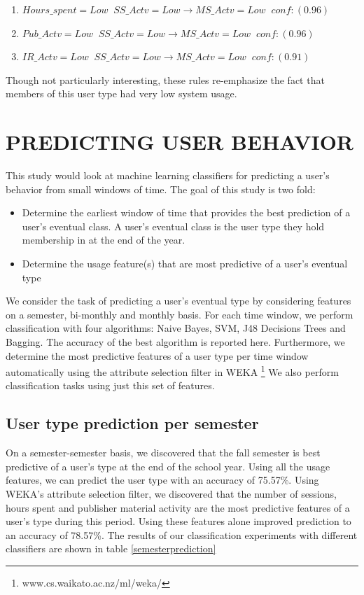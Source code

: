\documentclass{acm_proc_article-sp}
\begin{document}
\begin{enumerate}

\item $Hours\_spent=Low \;\; SS\_Actv=Low  \longrightarrow MS\_Actv =Low  \;\;    conf:(0.96)$
\item $Pub\_Actv=Low \;\; SS\_Actv=Low  \longrightarrow MS\_Actv = Low  \;\;  conf:(0.96)$
\item $IR\_Actv=Low  \;\;SS\_Actv=Low  \longrightarrow MS\_Actv=Low  \;\; conf:(0.91)$
\end{enumerate}
Though not particularly interesting, these rules re-emphasize the fact that members of this user type had very low system usage.

 \section {PREDICTING USER BEHAVIOR}
This study would look at machine learning classifiers for predicting a user's behavior from small windows of time. The goal of this study is two fold:
\begin{itemize}
\item Determine the earliest window of time that provides the best prediction of a user's eventual class. A user's eventual class is the user type they hold membership in at the end of the year.
\item Determine the usage feature(s) that are most predictive of a user's eventual type
\end{itemize}

We consider the task of predicting a user's eventual type by considering features on a semester, bi-monthly and monthly basis.
For each time window, we perform  classification with four algorithms: Naive Bayes, SVM, J48 Decisions Trees and Bagging. The accuracy of the best algorithm is reported here. Furthermore, we determine the most predictive features of a user type per time window automatically using the attribute selection filter in WEKA \footnote{www.cs.waikato.ac.nz/ml/weka/} We also perform classification tasks using just this set of features.
\subsection{User type prediction per semester}
On a semester-semester basis, we discovered that the fall semester is best predictive of a user's type at the end of the school year. Using all the usage features, we can predict the user type with an accuracy of 75.57\%. Using WEKA's attribute selection filter, we discovered that the number of sessions, hours spent and publisher material activity are the most predictive features of a user's type during this period. Using these features alone improved prediction to an accuracy of 78.57\%. The results of our classification experiments with different classifiers are shown in table \ref{semesterprediction}
\end{document}
